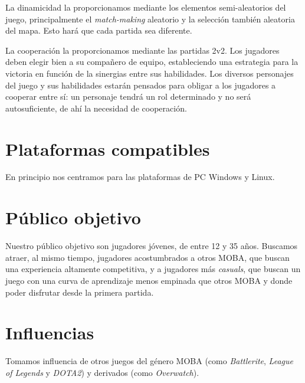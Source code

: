 \vspace{\baselineskip}

La dinamicidad la proporcionamos mediante los elementos semi-aleatorios del juego, principalmente el \emph{match-making} aleatorio y la selección también aleatoria del mapa. Esto hará que cada partida sea diferente.

La cooperación la proporcionamos mediante las partidas 2v2. Los jugadores deben elegir bien a su compañero de equipo, estableciendo una estrategia para la victoria en función de la sinergias entre sus habilidades. Los diversos personajes del juego y sus habilidades estarán pensados para obligar a los jugadores a cooperar entre sí: un personaje tendrá un rol determinado y no será autosuficiente, de ahí la necesidad de cooperación.



\section{Plataformas compatibles}
En principio nos centramos para las plataformas de PC Windows y Linux.


\section{Público objetivo}
Nuestro público objetivo son jugadores jóvenes, de entre 12 y 35 años. Buscamos atraer, al mismo tiempo, jugadores acostumbrados a otros MOBA, que buscan una experiencia altamente competitiva, y a jugadores más \emph{casuals}, que buscan un juego con una curva de aprendizaje menos empinada que otros MOBA y donde poder disfrutar desde la primera partida.


\section{Influencias}
Tomamos influencia de otros juegos del género MOBA (como \textit{Battlerite}, \textit{League of Legends} y \textit{DOTA2}) y derivados (como \textit{Overwatch}).


